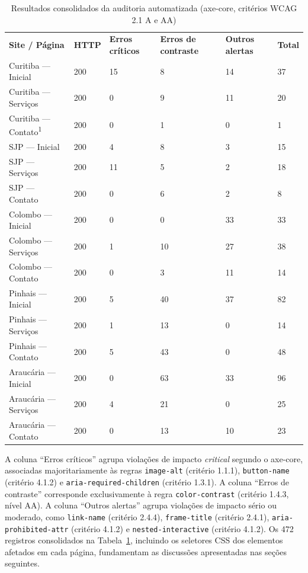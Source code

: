 \documentclass[brazil]{ifpr-pinhais}
\begin{document}
\begin{table}[htb]
\caption{Resultados consolidados da auditoria automatizada (axe-core, critérios WCAG 2.1 A e AA)}
\label{tab:wave}
\begin{tabular}{p{4.4cm} p{1.3cm} p{2.0cm} p{2.4cm} p{2.0cm} p{1.5cm}}
\rowcolor{headerblue}
\color{white}\textbf{Site / Página} & \color{white}\textbf{HTTP} & \color{white}\textbf{Erros críticos} & \color{white}\textbf{Erros de contraste} & \color{white}\textbf{Outros alertas} & \color{white}\textbf{Total} \\
Curitiba --- Inicial       & 200 & 15 & 8  & 14 & 37 \\
Curitiba --- Serviços      & 200 & 0  & 9  & 11 & 20 \\
Curitiba --- Contato\textsuperscript{1} & 200 & 0 & 1 & 0 & 1 \\
SJP --- Inicial            & 200 & 4  & 8  & 3  & 15 \\
SJP --- Serviços           & 200 & 11 & 5  & 2  & 18 \\
SJP --- Contato            & 200 & 0  & 6  & 2  & 8  \\
Colombo --- Inicial        & 200 & 0  & 0  & 33 & 33 \\
Colombo --- Serviços       & 200 & 1  & 10 & 27 & 38 \\
Colombo --- Contato        & 200 & 0  & 3  & 11 & 14 \\
Pinhais --- Inicial        & 200 & 5  & 40 & 37 & 82 \\
Pinhais --- Serviços       & 200 & 1  & 13 & 0  & 14 \\
Pinhais --- Contato        & 200 & 5  & 43 & 0  & 48 \\
Araucária --- Inicial      & 200 & 0  & 63 & 33 & 96 \\
Araucária --- Serviços     & 200 & 4  & 21 & 0  & 25 \\
Araucária --- Contato      & 200 & 0  & 13 & 10 & 23 \\
\end{tabular}
\end{table}

A coluna ``Erros críticos'' agrupa violações de impacto \textit{critical} segundo o axe-core, associadas majoritariamente às regras \texttt{image-alt} (critério 1.1.1), \texttt{button-name} (critério 4.1.2) e \texttt{aria-required-children} (critério 1.3.1). A coluna ``Erros de contraste'' corresponde exclusivamente à regra \texttt{color-contrast} (critério 1.4.3, nível AA). A coluna ``Outros alertas'' agrupa violações de impacto sério ou moderado, como \texttt{link-name} (critério 2.4.4), \texttt{frame-title} (critério 2.4.1), \texttt{aria-prohibited-attr} (critério 4.1.2) e \texttt{nested-interactive} (critério 4.1.2). Os 472 registros consolidados na Tabela~\ref{tab:wave}, incluindo os seletores CSS dos elementos afetados em cada página, fundamentam as discussões apresentadas nas seções seguintes.
\end{document}
